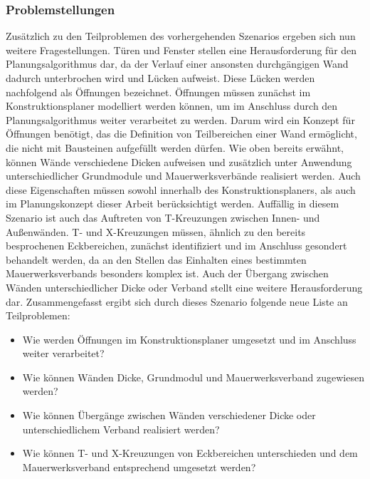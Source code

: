 \subsubsection*{Problemstellungen}
Zusätzlich zu den Teilproblemen des vorhergehenden Szenarios ergeben sich nun weitere Fragestellungen.
Türen und Fenster stellen eine Herausforderung für den Planungsalgorithmus dar, da der Verlauf einer ansonsten durchgängigen Wand dadurch unterbrochen wird und Lücken aufweist.
Diese \glqq{}Lücken\grqq{} werden nachfolgend als Öffnungen bezeichnet.
Öffnungen müssen zunächst im Konstruktionsplaner modelliert werden können, um im Anschluss durch den Planungsalgorithmus weiter verarbeitet zu werden.
Darum wird ein Konzept für Öffnungen benötigt, das die Definition von Teilbereichen einer Wand ermöglicht, die nicht mit Bausteinen aufgefüllt werden dürfen.
Wie oben bereits erwähnt, können Wände verschiedene Dicken aufweisen und zusätzlich unter Anwendung unterschiedlicher Grundmodule und Mauerwerksverbände realisiert werden.
Auch diese Eigenschaften müssen sowohl innerhalb des Konstruktionsplaners, als auch im Planungskonzept dieser Arbeit berücksichtigt werden.
Auffällig in diesem Szenario ist auch das Auftreten von T-Kreuzungen zwischen Innen- und Außenwänden.
T- und X-Kreuzungen müssen, ähnlich zu den bereits besprochenen Eckbereichen, zunächst identifiziert und im Anschluss gesondert behandelt werden, da an den Stellen das Einhalten eines bestimmten Mauerwerksverbands besonders komplex ist.
Auch der Übergang zwischen Wänden unterschiedlicher Dicke oder Verband stellt eine weitere Herausforderung dar.
Zusammengefasst ergibt sich durch dieses Szenario folgende neue Liste an Teilproblemen:
\begin{itemize}
  \item Wie werden Öffnungen im Konstruktionsplaner umgesetzt und im Anschluss weiter verarbeitet?
  \item Wie können Wänden Dicke, Grundmodul und Mauerwerksverband zugewiesen werden?
  \item Wie können Übergänge zwischen Wänden verschiedener Dicke oder unterschiedlichem Verband realisiert werden?
  \item Wie können T- und X-Kreuzungen von Eckbereichen unterschieden und dem Mauerwerksverband entsprechend umgesetzt werden? 
\end{itemize}

